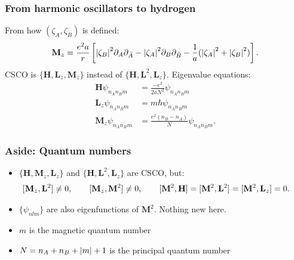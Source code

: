 \documentclass{beamer}
\theoremstyle{definition}
\newcommand{\lb}{\left[}
\newcommand{\rb}{\right]}
\newcommand{\p}{\partial}
\newcommand{\f}[2]{\frac{#1}{#2}}
\begin{document}
\begin{frame}
\frametitle{From harmonic oscillators to hydrogen}
From how $(\zeta_A, \zeta_B)$ is defined:
\begin{align*}
\mathbf{M}_z = \f{e^2a}{r} 
\lb  
\abs{\zeta_B}^2 \p_A \p_{\bar{A}}  
- \abs{\zeta_A}^2 \p_B \p_{\bar{B}} 
-  \f{1}{a} ( \abs{\zeta_A}^2 + \abs{\zeta_B}^2) 
\rb.
\end{align*} 
\pause 
CSCO is $\{ \mathbf{H}, \mathbf{L}_z, \mathbf{M}_z \}$ instead of $\{ \mathbf{H}, \mathbf{L}^2 , \mathbf{L}_z \}$. Eigenvalue equations:
\begin{align*}
\mathbf{H} \psi_{n_A n_B m} &= \f{-e^2}{2aN^2} \psi_{n_A n_B m} \\
\mathbf{L}_z \psi_{n_A n_B m} &= m \hbar \psi_{n_A n_B m}\\
\mathbf{M}_z \psi_{n_A n_B m} &= \f{e^2 (n_B - n_A)}{N}  \psi_{n_A n_B m}.
\end{align*}


\end{frame}



\begin{frame}
\frametitle{Aside: Quantum numbers}


\begin{itemize}

\item $\{ \mathbf{H}, \mathbf{M}_z, \mathbf{L}_z \}$ and $\{ \mathbf{H}, \mathbf{L}^2, \mathbf{L}_z \}$ are CSCO, but:
\begin{align*}
\hspace{-15pt}
[\mathbf{M}_z, \mathbf{L}^2] \neq 0, 
\quad\quad 
[\mathbf{M}_z, \mathbf{M}^2] \neq 0, 
\quad\quad 
[\mathbf{M}^2, \mathbf{H}] = [\mathbf{M}^2, \mathbf{L}^2] = [\mathbf{M}^2, \mathbf{L}_z] = 0.
\end{align*}

\item $\{\psi_{nlm}\}$ are also eigenfunctions of $\mathbf{M}^2$. Nothing new here.
\item $m$ is the magnetic quantum number
\item $N = n_A + n_B + \abs{m} + 1$ is the principal quantum number

\end{itemize}

\end{frame}
\end{document}
